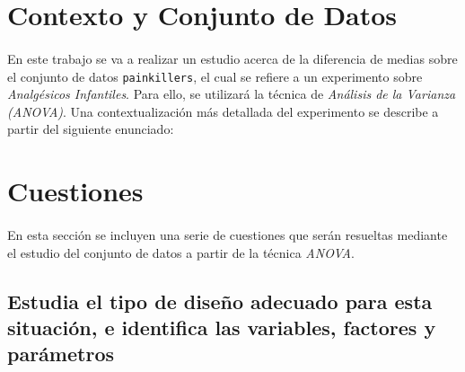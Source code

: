 \documentclass[11pt]{article}
\begin{document}
  \maketitle


  \section{Contexto y Conjunto de Datos}

    \paragraph{}
    En este trabajo se va a realizar un estudio acerca de la diferencia de medias sobre el conjunto de datos \texttt{painkillers}, el cual se refiere a un experimento sobre \emph{Analgésicos Infantiles}. Para ello, se utilizará la técnica de \emph{Análisis de la Varianza (ANOVA)}. Una contextualización más detallada del experimento se describe a partir del siguiente enunciado:

    \paragraph{}

  \section{Cuestiones}

    \paragraph{}
    En esta sección se incluyen una serie de cuestiones que serán resueltas mediante el estudio del conjunto de datos a partir de la técnica \emph{ANOVA}.

    \subsection{Estudia el tipo de diseño adecuado para esta situación, e identifica las variables, factores y parámetros}
\end{document}
